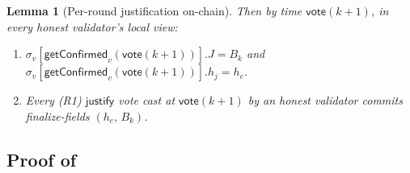 \documentclass{article}
\newcommand{\just}{\ensuremath{\mathsf{justify}}\xspace}
\newcommand{\vote}{\mathsf{vote}}
\newcommand{\getConfirmed}{\textsf{getConfirmed}\xspace}
\theoremstyle{plain}
\newtheorem{lemma}{Lemma}
\theoremstyle{definition}
\theoremstyle{remark}
\begin{document}
\begin{lemma}[Per-round justification on-chain]
Then by time $\vote(k+1)$, in every honest validator's local view:
\begin{enumerate}
  \item[\textnormal{(C1)}] $\sigma_v[\getConfirmed_v(\vote(k+1))].J = B_k$ and $\sigma_v[\getConfirmed_v(\vote(k+1))].h_j = h_c$.
  \item[\textnormal{(C2)}] Every \mbox{(R1)} \just vote cast at $\vote(k+1)$ by an honest validator commits finalize-fields $(h_c,\, B_k)$.
\end{enumerate}
\end{lemma}

\subsection{Proof of }\label{rev:subsec:per-round-proof}
\end{document}
